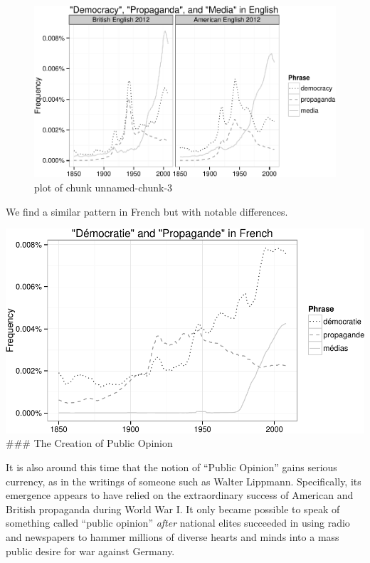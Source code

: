 \documentclass[12pt,book]{article}
\begin{document}
\begin{figure}[htbp]
\centering
\includegraphics{pacification_of_the_world_files/figure-latex/unnamed-chunk-3.pdf}
\caption{plot of chunk unnamed-chunk-3}
\end{figure}

We find a similar pattern in French but with notable differences.

\includegraphics{pacification_of_the_world_files/figure-latex/unnamed-chunk-4.pdf}
\#\#\# The Creation of Public Opinion

It is also around this time that the notion of ``Public Opinion'' gains
serious currency, as in the writings of someone such as Walter Lippmann.
Specifically, its emergence appears to have relied on the extraordinary
success of American and British propaganda during World War I. It only
became possible to speak of something called ``public opinion''
\emph{after} national elites succeeded in using radio and newspapers to
hammer millions of diverse hearts and minds into a mass public desire
for war against Germany.
\end{document}
